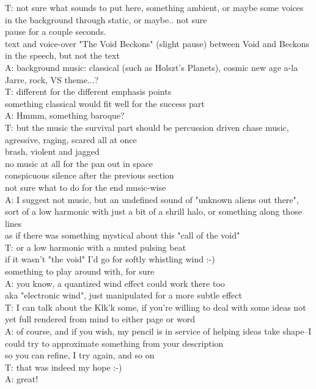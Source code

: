 T: not sure what sounds to put here, something ambient, or maybe some voices in the background through static, or maybe.. not sure\\
pause for a couple seconds.\\
text and voice-over "The Void Beckons" (slight pause) between Void and Beckons in the speech, but not the text\\
A: background music: classical (such as Holszt's Planets), cosmic new age a-la Jarre, rock, VS theme...?\\
T: different for the different emphasis points\\
something classical would fit well for the success part\\
A: Hmmm, something baroque?\\
T: but the music the survival part should be percussion driven chase music, agressive, raging, scared all at once\\
brash, violent and jagged\\
no music at all for the pan out in space\\
conspicuous silence after the previous section\\
not sure what to do for the end music-wise\\
A: I suggest not music, but an undefined sound of "unknown aliens out there", sort of a low harmonic with just a bit of a shrill halo, or something along those lines\\
as if there was something mystical about this "call of the void"\\
T: or a low harmonic with a muted pulsing beat\\
if it wasn't "the void" I'd go for softly whistling wind :-)\\
something to play around with, for sure\\
A: you know, a quantized wind effect could work there too\\
aka "electronic wind", just manipulated for a more subtle effect\\
T: I can talk about the Klk'k some, if you're willing to deal with some ideas not yet full rendered from mind to either page or word\\
A: of course, and if you wish, my pencil is in service of helping ideas take shape--I could try to approximate something from your description\\
so you can refine, I try again, and so on\\
T: that was indeed my hope :-)\\
A: great!\\

